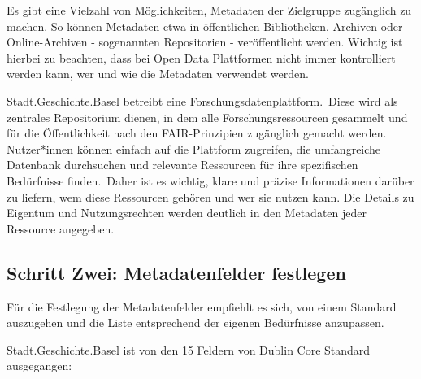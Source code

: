 \documentclass[
  letterpaper,
  DIV=11,
  numbers=noendperiod,
  landscape,
  a4paper,
  geometry:margin=1in]{scrartcl}
\begin{document}
Es gibt eine Vielzahl von Möglichkeiten, Metadaten der Zielgruppe
zugänglich zu machen. So können Metadaten etwa in öffentlichen
Bibliotheken, Archiven oder Online-Archiven - sogenannten Repositorien -
veröffentlicht werden. Wichtig ist hierbei zu beachten, dass bei Open
Data Plattformen nicht immer kontrolliert werden kann, wer und wie die
Metadaten verwendet werden.

\begin{tcolorbox}[enhanced jigsaw, colframe=quarto-callout-tip-color-frame, bottomtitle=1mm, coltitle=black, opacitybacktitle=0.6, toprule=.15mm, opacityback=0, arc=.35mm, toptitle=1mm, title=\textcolor{quarto-callout-tip-color}{\faLightbulb}\hspace{0.5em}{Erfahrungen der Stadt.Geschichte.Basel}, colbacktitle=quarto-callout-tip-color!10!white, colback=white, bottomrule=.15mm, breakable, titlerule=0mm, rightrule=.15mm, leftrule=.75mm, left=2mm]

Stadt.Geschichte.Basel betreibt eine
\href{https://forschung.stadtgeschichtebasel.ch/}{Forschungsdatenplattform}.~Diese
wird als zentrales Repositorium dienen, in dem alle Forschungsressourcen
gesammelt und für die Öffentlichkeit nach den FAIR-Prinzipien zugänglich
gemacht werden. Nutzer*innen können einfach auf die Plattform zugreifen,
die umfangreiche Datenbank durchsuchen und relevante Ressourcen für ihre
spezifischen Bedürfnisse finden.~Daher ist es wichtig, klare und präzise
Informationen darüber zu liefern, wem diese Ressourcen gehören und wer
sie nutzen kann. Die Details zu Eigentum und Nutzungsrechten werden
deutlich in den Metadaten jeder Ressource angegeben.

\end{tcolorbox}

\subsection{Schritt Zwei: Metadatenfelder
festlegen}\label{schritt-zwei-metadatenfelder-festlegen}

Für die Festlegung der Metadatenfelder empfiehlt es sich, von einem
Standard auszugehen und die Liste entsprechend der eigenen Bedürfnisse
anzupassen.

Stadt.Geschichte.Basel ist von den 15 Feldern von Dublin Core Standard
ausgegangen:
\end{document}
